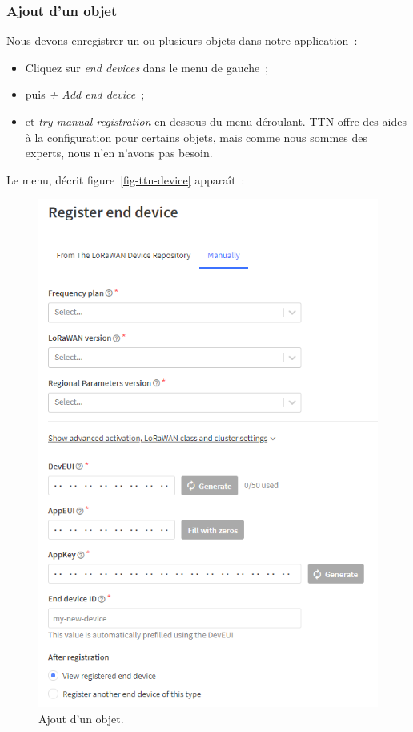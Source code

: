 \subsubsection*{Ajout d'un objet}

Nous devons enregistrer un ou plusieurs objets dans notre application~:

\begin{itemize}
    \item Cliquez sur \textit{end devices} dans le menu de gauche~;
    \item puis \textit{+ Add end device}~;
    \item et \textit{try manual registration} en dessous du menu déroulant. TTN offre des aides à la configuration pour certains objets, mais comme nous sommes des experts, nous n'en n'avons pas besoin.
\end{itemize}

     \vspace{1em}


Le menu, décrit figure~\vref{fig-ttn-device} apparaît~:

\begin{figure}[tbp]
\centerline{\includegraphics[width=.7\columnwidth]{Pictures/ttn-device.png} }
\caption{Ajout d'un objet.}
\label{fig-ttn-device}
\end{figure}

